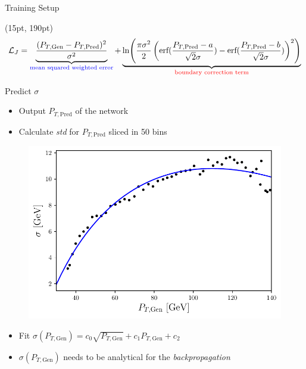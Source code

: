 \documentclass[10pt]{beamer}
\begin{document}
\begin{frame}{Training Setup}
  \begin{textblock*}{250pt}(15pt, 190pt)
    \begin{align*}
      \mathcal{L}_J=\underbrace{\frac{(P_{T,\text{Gen}}-P_{T,\text{Pred}})^2}{\sigma^2}}_{\text{\textcolor{blue}{mean squared weighted error}}} +\underbrace{\ln(\frac{\pi \sigma^2}{2} \left(\text{erf}(\frac{P_{T,\text{Pred}}-a}{\sqrt{2}\sigma}) - \text{erf}(\frac{P_{T,\text{Pred}}-b}{\sqrt{2}\sigma})\right)^2)}_{\text{\textcolor{red}{boundary correction term}}}
    \end{align*}
  \end{textblock*}
\end{frame}

\begin{frame}{Predict $\sigma$}

  \begin{itemize}
  \item Output $P_{T,\text{Pred}}$ of the network
  \item Calculate \emph{std} for $P_{T,\text{Pred}}$ sliced in 50 bins
  \end{itemize}  
 
  \begin{figure}[hbtp]
    \centering
    \includegraphics[width=.7\linewidth]{../images/sigma_fit.pdf}
  \end{figure}
\begin{itemize}
\item Fit \(\sigma(P_{T,\text{Gen}})= c_0 \sqrt{P_{T,\text{Gen}}}+c_1 P_{T,\text{Gen}} + c_2 \)
\item  \(\sigma(P_{T,\text{Gen}}) \) needs to be analytical for the \emph{backpropagation}
\end{itemize}  
\end{frame}
\end{document}
